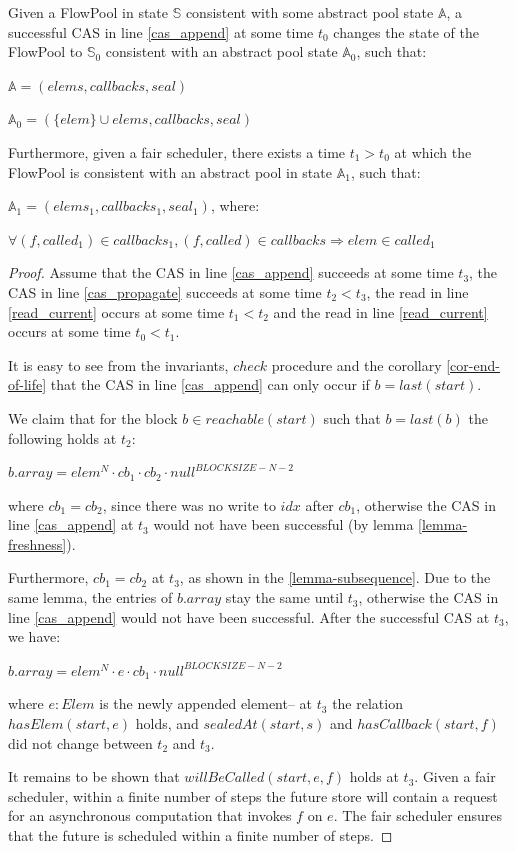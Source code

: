 \documentclass[runningheads,a4paper]{llncs}
\begin{document}
\begin{lemma}\label{lemma-append}
Given a FlowPool in state $\mathbb{S}$ consistent with some abstract pool state $\mathbb{A}$, 
a successful CAS in line \ref{cas_append} at some time $t_0$ changes the state of the FlowPool 
to $\mathbb{S}_0$ consistent with an abstract pool state $\mathbb{A}_0$, such that:

$\mathbb{A} = (elems, callbacks, seal)$

$\mathbb{A}_0 = (\{elem\} \cup elems, callbacks, seal)$

Furthermore, given a fair scheduler, there exists a time $t_1 > t_0$ at which the FlowPool 
is consistent with an abstract pool in state $\mathbb{A}_1$, such that:

$\mathbb{A}_1 = (elems_1, callbacks_1, seal_1)$, where:

$\forall (f, called_1) \in callbacks_1, (f, called) \in callbacks \Rightarrow elem \in called_1$
\end{lemma}

\begin{proof}
Assume that the CAS in line \ref{cas_append} succeeds at some time
$t_3$, the CAS in line \ref{cas_propagate} succeeds at some time $t_2 <
t_3$, the read in line \ref{read_current} occurs at some time $t_1 <
t_2$ and the read in line \ref{read_current} occurs at some time $t_0
< t_1$.

It is easy to see from the invariants, $check$ procedure and the
corollary \ref{cor-end-of-life} that the CAS in line \ref{cas_append} can only
occur if $b = last(start)$.

We claim that for the block $b \in reachable(start)$ such that $b = last(b)$ the
following holds at $t_2$:

$b.array = elem^N \cdot cb_1 \cdot cb_2 \cdot null^{BLOCKSIZE - N - 2}$

where $cb_1 = cb_2$, since there was no write to $idx$ after $cb_1$, otherwise the
CAS in line \ref{cas_append} at $t_3$ would not have been successful
(by lemma \ref{lemma-freshness}).

Furthermore, $cb_1 = cb_2$ at $t_3$, as shown in the 
\ref{lemma-subsequence}. Due to the same lemma, the entries of
$b.array$ stay the same until $t_3$, otherwise the CAS in line
\ref{cas_append} would not have been successful.
After the successful CAS at $t_3$, we have:

$b.array = elem^N \cdot e \cdot cb_1 \cdot null^{BLOCKSIZE - N - 2}$

where $e: Elem$ is the newly appended element-- at $t_3$ the relation
$hasElem(start, e)$ holds, and $sealedAt(start, s)$ and $hasCallback(start,
f)$ did not change between $t_2$ and $t_3$.

It remains to be shown that $willBeCalled(start, e, f)$ holds at $t_3$.
Given a fair scheduler, within a finite number of steps the
future store will contain a request for an asynchronous computation
that invokes $f$ on $e$. The fair scheduler ensures that the future is
scheduled within a finite number of steps.
\end{proof}
\end{document}
